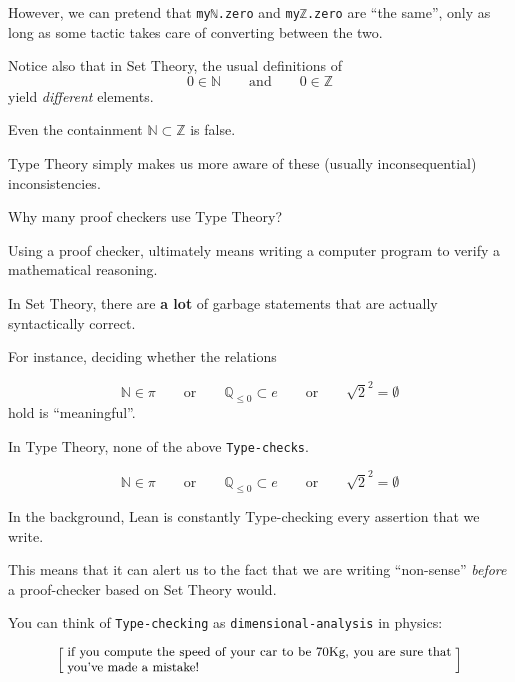 \documentclass{beamer}
\begin{document}
\begin{frame}[fragile]

However, we can pretend that {\color{violet}\verb`myℕ.zero`} and {\color{violet}\verb`myℤ.zero`} are ``the same'', only as long as some tactic takes care of converting between the two.
\bigskip

Notice also that in Set Theory, the usual definitions of
$$
  0 \in \mathbb{N} \qquad {\textrm{and}} \qquad 0 \in \mathbb{Z}
$$
yield {\emph{different}} elements.
\bigskip

Even the containment $\mathbb{N} \subset \mathbb{Z}$ is false.
\bigskip

Type Theory simply makes us more aware of these (usually inconsequential) inconsistencies.
\end{frame}

\begin{frame}[fragile]{Why many proof checkers use Type Theory?}

Using a proof checker, ultimately means writing a computer program to verify a mathematical reasoning.
\bigskip

In Set Theory, there are {\textbf{a lot}} of garbage statements that are actually syntactically correct.
\bigskip

For instance, deciding whether the relations

$$
  \mathbb{N} \in \pi
  \qquad {\textrm{or}} \qquad
  \mathbb{Q}_{\le 0} \subset e
  \qquad {\textrm{or}} \qquad
  \sqrt{2} ^ 2 = \emptyset
$$
hold is ``meaningful''.
\bigskip

In Type Theory, none of the above {\color{violet}\verb`Type-checks`}.
\end{frame}

\begin{frame}[fragile]

$$
  \mathbb{N} \in \pi
  \qquad {\textrm{or}} \qquad
  \mathbb{Q}_{\le 0} \subset e
  \qquad {\textrm{or}} \qquad
  \sqrt{2} ^ 2 = \emptyset
$$
\bigskip

In the background, Lean is constantly Type-checking every assertion that we write.
\bigskip

This means that it can alert us to the fact that we are writing ``non-sense'' {\emph{before}} a proof-checker based on Set Theory would.
\bigskip

You can think of {\color{violet}\verb`Type-checking`} as {\color{violet}\verb`dimensional-analysis`} in physics:

\smallskip
\[
  \left[ \;
  \makebox{\parbox{0.8\textwidth}{\small
  if you compute the speed of your car to be $70$Kg, you are sure that you've made a mistake!
  }}
  \; \right]
\]
\bigskip
\end{frame}
\end{document}
